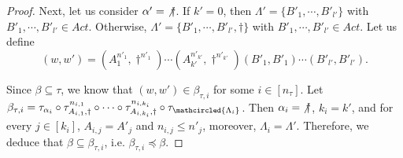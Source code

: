\begin{proof}
Next, let us consider $\alpha' = {\not \dag}$. If $k' = 0$, then $\Lambda' = \{B'_1, \cdots, B'_{l'}\}$ with $B'_{1}, \cdots, B'_{ l'} \in Act$. Otherwise,  $\Lambda' = \{ B'_{1}, \cdots, B'_{l'}, \dag\}$ with $B'_{1}, \cdots, B'_{ l'} \in Act$.
Let us define 
$$(w, w') = (A^{n'_{1}}_{1}, \dag^{n'_{1}}) \cdots (A^{n'_{k'}}_{k'}, \dag^{n'_{ k'}}) (B'_{1}, B'_{1}) \cdots (B'_{ l'}, B'_{ l'}).$$

Since $\beta \subseteq \tau$, we know that $(w, w') \in \beta_{\tau, i}$ for some $i \in [n_\tau]$. 
Let $ \beta_{\tau, i} = \tau_{\alpha_i} \circ \tau^{n_{i,1}}_{A_{i,1}, \dag} \circ \cdots \circ  \tau^{n_{i, k_i}}_{A_{i,k_i}, \dag} \circ \tau_{\mathcircled{\Lambda_i}}$.
%
Then $\alpha_i = {\not \dag}$, $k_i = k'$, and for every $j \in [k_i]$, $A_{i, j} = A'_{j}$ and $n_{i, j} \le n'_{ j}$, moreover, $\Lambda_i = \Lambda'$.
Therefore, we deduce that $\beta \subseteq \beta_{\tau, i}$, i.e. $\beta_{\tau, i} \preceq \beta$.
\end{proof}

